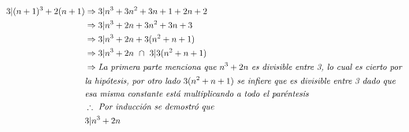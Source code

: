 \documentclass{article}
\begin{document}
\begin{align*}
3|(n+1)^3 + 2(n + 1) &\Rightarrow 3|n^3 + 3n^2 + 3n + 1 + 2n + 2 \\
&\Rightarrow 3|n^3 + 2n + 3n^2 + 3n + 3 \\
&\Rightarrow 3|n^3 + 2n + 3(n^2 + n +1) \\
&\Rightarrow 3|n^3 + 2n \textit{   } \cap \textit{   } 3|3(n^2 + n +1) \\
&\Rightarrow \textit{La primera parte menciona que \(n^3 + 2n\) es divisible entre 3, lo cual es cierto por} \\
&\textit{la hipótesis, por otro lado \( 3(n^2 + n +1) \) se infiere que es divisible entre 3 dado que} \\
&\textit{esa misma constante está multiplicando a todo el paréntesis} \\
&\therefore \textit{ Por inducción se demostró que } \\
& 3|n^3 + 2n \\
\end{align*}
\end{document}
